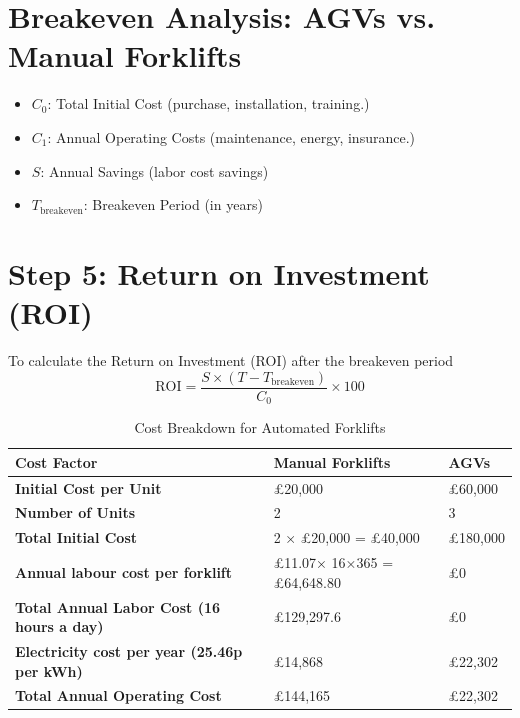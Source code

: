 \documentclass[12pt]{article}
\begin{document}
 

\section*{Breakeven Analysis: AGVs vs. Manual Forklifts}

 \begin{itemize}
    \item \( C_0 \): Total Initial Cost (purchase, installation, training.)
    \item \( C_1 \): Annual Operating Costs (maintenance, energy, insurance.)
    \item \( S \): Annual Savings (labor cost savings)
    \item \( T_{\text{breakeven}} \): Breakeven Period (in years)
\end{itemize}

\section{Step 5: Return on Investment (ROI)}
To calculate the Return on Investment (ROI) after the breakeven period 
\[
\text{ROI} = \frac{S \times (T - T_{\text{breakeven}})}{C_0} \times 100
\]
 
\begin{table}[htbp]
\centering
\begin{tabular}{|l|l|l|}
\hline
\textbf{Cost Factor}                   & \textbf{Manual Forklifts}           & \textbf{AGVs } \\ \hline
\textbf{Initial Cost per Unit}          & £20,000                             & £60,000                               \\ \hline
\textbf{Number of Units}                & 2                                    & 3                                     \\ \hline
\textbf{Total Initial Cost}             & 2 × £20,000 = £40,000               & £180,000                \\ \hline
\textbf{Annual labour cost per forklift }& £11.07× 16×365 = £64,648.80      & £0                                    \\ \hline
\textbf{Total Annual Labor Cost (16 hours a day)}        & £129,297.6    & £0                                    \\ \hline
 \textbf{Electricity cost per year (25.46p per kWh) }& £14,868&£22,302\\\hline  
 
\textbf{Total Annual Operating Cost}    & £144,165& £22,302\\ \hline
 
  
\end{tabular}

\caption{Cost Breakdown for Automated Forklifts}
\end{table}
\end{document}

